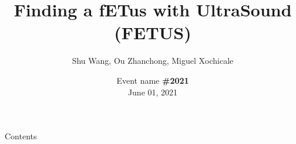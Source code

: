 \documentclass[xcolor={dvipsnames},aspectratio=169,10pt]{beamer}
\title{Finding a fETus with UltraSound (FETUS)}
\author{
Shu Wang,
Ou Zhanchong,
Miguel Xochicale
}
\date{
Event name {\bf \#2021} \\
June 01, 2021
}
\institute{
	\faEnvelope   e-mail@server.com \\
	\faGithubAlt @githubhandler \faTwitter @twitterhandler
		}
\begin{document}
\maketitle

\begin{frame}{Contents}
    \tableofcontents
\end{frame}

%
%








\maketitle
\end{document}
